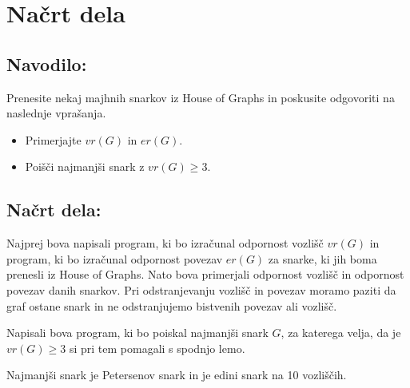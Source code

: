 \documentclass[a4paper, 10pt]{article}
\begin{document}
\section{Načrt dela}

\subsection*{Navodilo:}
Prenesite nekaj majhnih snarkov iz House of Graphs in
poskusite odgovoriti na naslednje vprašanja.
\begin{itemize}
    \item Primerjajte $vr(G)$ in $er(G)$.
    \item Poišči najmanjši snark z $vr(G) \ge 3$.
\end{itemize}

\subsection*{Načrt dela:}
Najprej bova napisali program, ki bo izračunal odpornost vozlišč $vr(G)$ in program, ki bo 
izračunal odpornost povezav $er(G)$ za snarke, ki jih boma prenesli iz House of Graphs.
Nato bova primerjali odpornost vozlišč in odpornost povezav danih snarkov. Pri odstranjevanju
vozlišč in povezav moramo paziti da graf ostane snark in ne odstranjujemo bistvenih povezav ali vozlišč.

Napisali bova program, ki bo poiskal najmanjši snark $G$, za katerega velja, da je $vr(G) \ge 3$ 
si pri tem pomagali s spodnjo lemo.
\begin{lemma}
    Najmanjši snark je Petersenov snark in je edini snark na 10 vozliščih.
\end{lemma}
\end{document}
